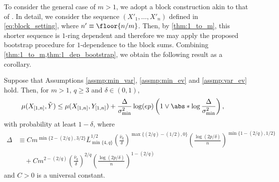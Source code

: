 \documentclass[aos]{imsart}
\begin{document}
\medskip
To consider the general case of $m > 1$, we adopt a block construction akin to that of \citet{zhang2014bootstrapping}. In detail, we consider the sequence  $(X'_1,\ldots,X'_n)$ defined in \cref{eq:block_setting}, where $n' \equiv \floor{{n}/{m}}$. Then, 
by \cref{thm:1_to_m}, this shorter sequence is $1$-ring dependent and therefore we may apply the proposed bootstrap procedure for $1$-dependence to the block sums.
Combining \cref{thm:1_to_m,thm:1_dep_bootstrap}, we obtain the following result as a corollary.
\begin{corollary} \label{thm:m_dep_bootstrap}
    Suppose that Assumptions \eqref{assmp:min_var}, \eqref{assmp:min_ev} and \eqref{assmp:var_ev} hold. Then, for $m > 1$, $q \geq 3$ and $\delta \in (0, 1)$, 
    \begin{equation*}
    \begin{aligned}
        \mu(X_{[1,n]}, \tilde{Y}) 
        & \leq \mu(X_{[1,n]}, Y_{[1,n]})
        + \frac{\Delta}{\sigma_{\min}^2} \log (ep) \left( 1 \vee \abs*{\log\frac{\Delta}{\sigma_{\min}^2}} \right),
    \end{aligned}
    \end{equation*}
    with probability at least $1 - \delta$, where
    \begin{equation*}
    \begin{aligned}
        \Delta & \equiv C m^{\min\{2-(2/q), 3/2\}} \bar{L}_{\min\{4, q\}}^{1/2} \left(\frac{\bar{\nu}_{q}}{\delta} \right)^{\max\{(2/q)-(1/2),0\}}
        \left(\frac{\log(2p/\delta)}{n}\right)^{\min\{1-(2/q), 1/2\}} \\
        & \quad + C m^{2-(2/q)} \left(\frac{\bar{\nu}_{q}}{\delta} \right)^{2/q} \left(\frac{\log(2p/\delta)}{n}\right)^{1-(2/q)}
    \end{aligned}
    \end{equation*}
    and $C > 0$ is a universal constant.
\end{corollary}
\end{document}
